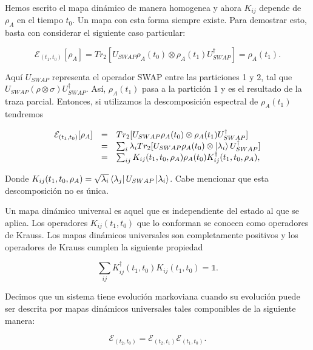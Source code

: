 Hemos escrito el mapa dinámico de manera homogenea y ahora $K_{ij}$ depende de $\rho_A$ en el tiempo $t_0$. Un mapa con esta forma siempre existe. Para demostrar esto, basta con considerar el siguiente caso particular:

\begin{equation}
    \mathcal{E}_{(t_1, t_0)}[\rho_A] = Tr_2[U_{SWAP} \rho_A(t_0) \otimes \rho_A(t_1) U_{SWAP}^\dagger] = \rho_A(t_1) .
\end{equation}

Aquí $U_{SWAP}$ representa el operador SWAP entre las particiones 1 y 2, tal que $U_{SWAP} (\rho \otimes \sigma) U_{SWAP}^\dagger$. Así, $\rho_A(t_1)$ pasa a la partición 1 y es el resultado de la traza parcial. Entonces, si utilizamos la descomposición espectral de $\rho_A(t_1)$ tendremos

\begin{equation}
    \begin{array}{r c l}
        \mathcal{E}_{(t_1, t_0)}[\rho_A]
        &=& Tr_2[U_{SWAP} \rho_A(t_0) \otimes \rho_A(t_1) U_{SWAP}^\dagger] \\
        &=& \sum_i \lambda_i Tr_2[U_{SWAP} \rho_A(t_0) \otimes \ket{\lambda_i} U_{SWAP}^\dagger] \\
        &=& \sum_{ij} K_{ij}(t_1, t_0, \rho_A) \rho_A(t_0) K^\dagger_{ij}(t_1, t_0, \rho_A) ,
    \end{array}
\end{equation}

Donde $K_{ij}(t_1, t_0, \rho_A) = \sqrt{\lambda_i} \bra{\lambda_j} U_{SWAP} \ket{\lambda_i}$. Cabe mencionar que esta descomposición no es única.

Un mapa dinámico universal es aquel que es independiente del estado al que se aplica. Los operadores $K_{ij}(t_1, t_0)$ que lo conforman se conocen como operadores de Krauss. Los mapas dinámicos universales son completamente positivos y los operadores de Krauss cumplen la siguiente propiedad

\begin{equation}
    \sum_{ij} K_{ij}^\dagger(t_1, t_0) K_{ij}(t_1, t_0) = \mathds{1} .
\end{equation}

Decimos que un sistema tiene evolución markoviana cuando su evolución puede ser descrita por mapas dinámicos universales tales componibles de la siguiente manera:

\begin{equation}
    \mathcal{E}_{(t_2, t_0)} = \mathcal{E}_{(t_2, t_1)} \mathcal{E}_{(t_1, t_0)} .
\end{equation}


